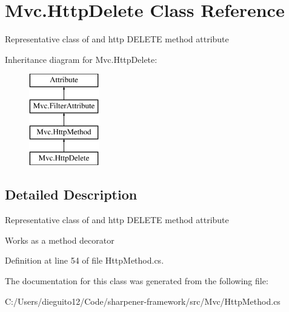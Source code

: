 \hypertarget{class_mvc_1_1_http_delete}{}\section{Mvc.\+Http\+Delete Class Reference}
\label{class_mvc_1_1_http_delete}


Representative class of and http D\+E\+L\+E\+TE method attribute  


Inheritance diagram for Mvc.\+Http\+Delete\+:\begin{figure}[H]
\begin{center}
\leavevmode
\includegraphics[height=4.000000cm]{class_mvc_1_1_http_delete}
\end{center}
\end{figure}


\subsection{Detailed Description}
Representative class of and http D\+E\+L\+E\+TE method attribute 

Works as a method decorator

Definition at line 54 of file Http\+Method.\+cs.



The documentation for this class was generated from the following file\+:\begin{DoxyCompactItemize}
\item 
C\+:/\+Users/dieguito12/\+Code/sharpener-\/framework/src/\+Mvc/Http\+Method.\+cs\end{DoxyCompactItemize}
